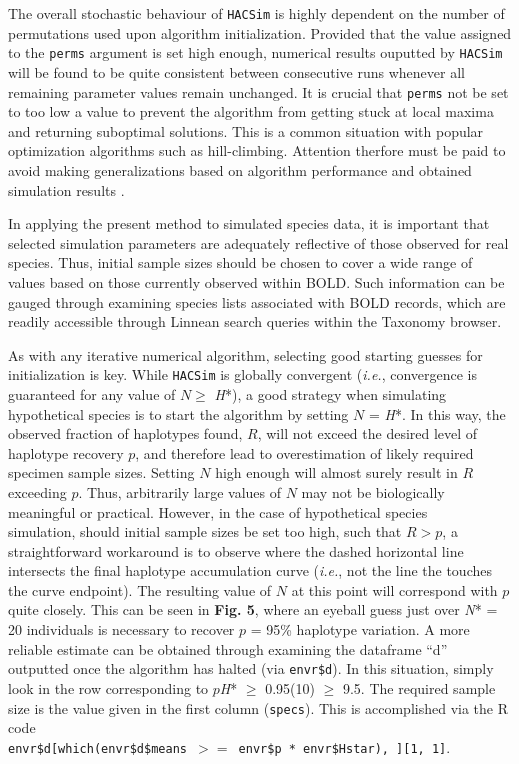 The overall stochastic behaviour of {\tt HACSim} is highly dependent on the number of \\ permutations used upon algorithm initialization. Provided that the value assigned to the {\tt  perms} argument is set high enough, numerical results ouputted by {\tt HACSim} will be found to be quite consistent between consecutive runs whenever all remaining parameter values remain unchanged. It is crucial that {\tt perms} not be set to too low a value to prevent the algorithm from getting stuck at local maxima and returning suboptimal solutions. This is a common situation with popular optimization algorithms such as hill-climbing. Attention therfore must be paid to avoid making generalizations based on algorithm performance and obtained simulation results \cite{spall2012stochastic}.



In applying the present method to simulated species data, it is important that selected simulation parameters are adequately reflective of those observed for real species. Thus, initial sample sizes should be chosen to cover a wide range of values based on those currently observed within BOLD. Such information can be gauged through examining species lists associated with BOLD records, which are readily accessible through Linnean search queries within the Taxonomy browser.



As with any iterative numerical algorithm, selecting good starting guesses for \\ initialization is key. While {\tt HACSim} is globally convergent (\textit{i.e.}, convergence is guaranteed for any value of $N \geq$ \textit{H}*), a good strategy when simulating hypothetical species is to start the algorithm by setting $N$ = \textit{H}*. In this way, the observed fraction of haplotypes found, $R$, will not exceed the desired level of haplotype recovery $p$, and therefore lead to overestimation of likely required specimen sample sizes. Setting $N$ high enough will almost surely result in $R$ exceeding $p$. Thus, arbitrarily large values of $N$ may not be biologically meaningful or practical. However, in the case of hypothetical species \\ simulation, should initial sample sizes be set too high, such that $R > p$, a straightforward workaround is to observe where the dashed horizontal line intersects the final haplotype accumulation curve (\textit{i.e.}, not the line the touches the curve endpoint). The resulting value of $N$ at this point will correspond with $p$ quite closely. This can be seen in \textbf{Fig. 5}, where an eyeball guess just over \textit{N}* = 20 individuals is necessary to recover $p$ = 95\% haplotype variation. A more reliable estimate can be obtained through examining the dataframe ``d'' outputted once the algorithm has halted (via {\tt envr\$d}). In this situation, simply look in the row corresponding to $p$\textit{H}* $\geq$ 0.95(10) $\geq$ 9.5. The required sample size is the value given in the first column ({\tt specs}). This is accomplished via the R code \\ {\tt envr\$d[which(envr\$d\$means $>=$ envr\$p * envr\$Hstar), ][1, 1]}.



